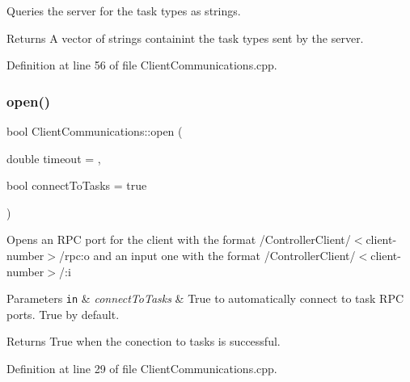 Queries the server for the task types as strings.

\begin{DoxyReturn}{Returns}
A vector of strings containint the task types sent by the server. 
\end{DoxyReturn}


Definition at line 56 of file Client\+Communications.\+cpp.

\hypertarget{classocra__recipes_1_1ClientCommunications_a5ef6606831f855ae97815f4a34e1e1a1}{}\label{classocra__recipes_1_1ClientCommunications_a5ef6606831f855ae97815f4a34e1e1a1} 
\subsubsection{\texorpdfstring{open()}{open()}}
{\footnotesize\ttfamily bool Client\+Communications\+::open (\begin{DoxyParamCaption}\item[{double}]{timeout = {},  }\item[{bool}]{connect\+To\+Tasks = {\ttfamily true} }\end{DoxyParamCaption})}

Opens an R\+PC port for the client with the format /\+Controller\+Client/$<$client-\/number$>$/rpc\+:o and an input one with the format /\+Controller\+Client/$<$client-\/number$>$/\+:i 
\begin{DoxyParams}[1]{Parameters}
\mbox{\tt in}  & {\em connect\+To\+Tasks} & True to automatically connect to task R\+PC ports. True by default. \\
\hline
\end{DoxyParams}
\begin{DoxyReturn}{Returns}
True when the conection to tasks is successful. 
\end{DoxyReturn}


Definition at line 29 of file Client\+Communications.\+cpp.

\hypertarget{classocra__recipes_1_1ClientCommunications_ae1d3d48e76010741a8d6f3622191156c}{}\label{classocra__recipes_1_1ClientCommunications_ae1d3d48e76010741a8d6f3622191156c} 
